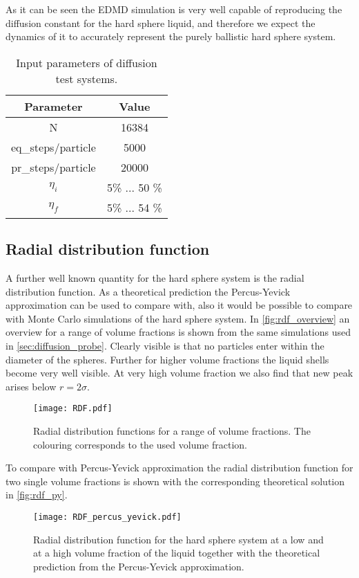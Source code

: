 As it can be seen the EDMD simulation is very well capable of reproducing the diffusion constant for the hard sphere liquid, and therefore we expect the dynamics of it to accurately represent the purely ballistic hard sphere system.\\


\begin{table}[h]
\centering
\begin{tabular}{c|c}
Parameter & Value \\ \hline
N & 16384 \\
eq\_steps/particle & 5000 \\
pr\_steps/particle & 20000 \\
$\eta_i$ & 5\% ... 50 \% \\
$\eta_f$ & 5\% ... 54 \% \\
\end{tabular}
\caption[Simulation parameters for diffusion measurement]{Input parameters of diffusion test systems.}
\label{tab:system_diffusion}
\end{table}





\subsection{Radial distribution function}
\label{sec:RDF_prob}
A further well known quantity for the hard sphere system is the radial distribution function. As a theoretical prediction the Percus-Yevick approximation can be used to compare with, also it would be possible to compare with Monte Carlo simulations of the hard sphere system. In \autoref{fig:rdf_overview} an overview for a range of volume fractions is shown from the same simulations used in \autoref{sec:diffusion_probe}. Clearly visible is that no particles enter within the diameter of the spheres. Further for higher volume fractions the liquid shells become very well visible. At very high volume fraction we also find that  new peak arises below $r = 2 \sigma$.
\begin{figure}[h]
\centering
\texttt{[image: RDF.pdf]}
\caption[Radial distribution functions at varying volume fractions]{Radial distribution functions for a range of volume fractions. The colouring corresponds to the used volume fraction.}
\label{fig:rdf_overview}
\end{figure}

To compare with Percus-Yevick approximation the radial distribution function for two single volume fractions is shown with the corresponding theoretical solution in \autoref{fig:rdf_py}.
\begin{figure}[h]
\centering
\texttt{[image: RDF\_percus\_yevick.pdf]}
\caption[Radial distribution function with Percus-Yevick solution]{Radial distribution function for the hard sphere system at a low and at a high volume fraction of the liquid together with the theoretical prediction from the Percus-Yevick approximation.}
\label{fig:rdf_py}
\end{figure}

